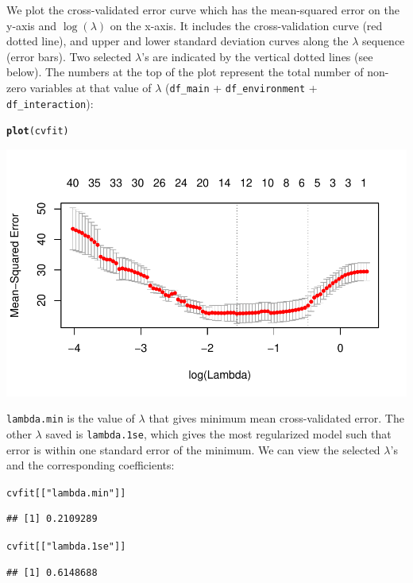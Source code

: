 \documentclass[12pt,letter]{article}\usepackage[]{graphicx}\usepackage[]{color}
\makeatletter
\newcommand{\hlstr}[1]{\textcolor[rgb]{0.192,0.494,0.8}{#1}}%
\newcommand{\hlstd}[1]{\textcolor[rgb]{0.345,0.345,0.345}{#1}}%
\newcommand{\hlkwd}[1]{\textcolor[rgb]{0.737,0.353,0.396}{\textbf{#1}}}%
\newenvironment{kframe}{%
 \def\at@end@of@kframe{}%
 \ifinner\ifhmode%
  \def\at@end@of@kframe{\end{minipage}}%
  \begin{minipage}{\columnwidth}%
 \fi\fi%
 \def\FrameCommand##1{\hskip\@totalleftmargin \hskip-\fboxsep
 \colorbox{shadecolor}{##1}\hskip-\fboxsep
     \hskip-\linewidth \hskip-\@totalleftmargin \hskip\columnwidth}%
 \MakeFramed {\advance\hsize-\width
   \@totalleftmargin\z@ \linewidth\hsize
   \@setminipage}}%
 {\par\unskip\endMakeFramed%
 \at@end@of@kframe}
\newenvironment{knitrout}{}{} %
\makeatother
\begin{document}
We plot the cross-validated error curve which has the mean-squared error on the y-axis and $\log(\lambda)$ on the x-axis. It includes the cross-validation curve (red dotted line), and upper and lower standard deviation curves along the $\lambda$ sequence (error bars). Two selected $\lambda$'s are indicated by the vertical dotted lines (see below). The numbers at the top of the plot represent the total number of non-zero variables at that value of $\lambda$ (\texttt{df\_main} + \texttt{df\_environment} + \texttt{df\_interaction}):


\begin{knitrout}\scriptsize
{}\color{fgcolor}\begin{kframe}
\begin{alltt}
\hlkwd{plot}\hlstd{(cvfit)}
\end{alltt}
\end{kframe}

{\centering \includegraphics[width=1\linewidth]{figure/sail-cv-1} 

}



\end{knitrout}

\texttt{lambda.min} is the value of $\lambda$ that gives minimum mean cross-validated error. The other $\lambda$ saved is \texttt{lambda.1se},
which gives the most regularized model such that error is within one standard error of the minimum. We can view the selected $\lambda$'s and the corresponding coefficients:

\begin{knitrout}\scriptsize
{}\color{fgcolor}\begin{kframe}
\begin{alltt}
\hlstd{cvfit[[}\hlstr{"lambda.min"}\hlstd{]]}
\end{alltt}
\begin{verbatim}
## [1] 0.2109289
\end{verbatim}
\begin{alltt}
\hlstd{cvfit[[}\hlstr{"lambda.1se"}\hlstd{]]}
\end{alltt}
\begin{verbatim}
## [1] 0.6148688
\end{verbatim}
\end{kframe}
\end{knitrout}
\end{document}
